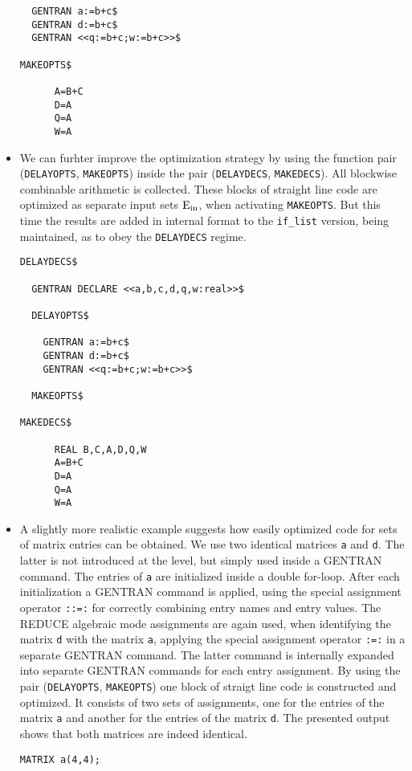 \begin{itemize}
{\begin{verbatim}
  GENTRAN a:=b+c$
  GENTRAN d:=b+c$
  GENTRAN <<q:=b+c;w:=b+c>>$

MAKEOPTS$

      A=B+C
      D=A
      Q=A
      W=A
\end{verbatim}}
\item We can furhter improve the optimization strategy by using the 
function pair ({\tt DELAYOPTS}, {\tt MAKEOPTS}) inside the 
pair ({\tt DELAYDECS}, {\tt MAKEDECS}). All blockwise combinable arithmetic
is collected. These blocks of straight line code are optimized as separate
input sets ${\rm E_{in}}$, when activating {\tt MAKEOPTS}. But this time the
results are added in internal format to the {\tt if\_list} version, 
being maintained, as to obey the {\tt DELAYDECS} regime.
{\small
\begin{verbatim}
DELAYDECS$

  GENTRAN DECLARE <<a,b,c,d,q,w:real>>$

  DELAYOPTS$

    GENTRAN a:=b+c$
    GENTRAN d:=b+c$
    GENTRAN <<q:=b+c;w:=b+c>>$

  MAKEOPTS$

MAKEDECS$

      REAL B,C,A,D,Q,W
      A=B+C
      D=A
      Q=A
      W=A
\end{verbatim}}
\item A slightly more realistic example suggests how easily optimized code
for sets of matrix entries can be obtained. We use two identical matrices
{\tt a} and {\tt d}. The latter is not introduced at the {\REDUCE} level,
but simply used inside a GENTRAN command. The entries of {\tt a} are
initialized inside a double for-loop. After each initialization a GENTRAN
command is applied, using the special assignment operator {\tt ::=:} for
correctly combining entry names and entry values. The REDUCE algebraic mode 
assignments are again used, when identifying the matrix {\tt d} with the 
matrix {\tt a}, applying the special assignment operator {\tt :=:} in a 
separate GENTRAN command. The latter command is internally expanded into
separate GENTRAN commands for each entry assignment. By using the pair
({\tt DELAYOPTS}, {\tt MAKEOPTS}) one block of straigt line code is
constructed and optimized. It consists of two sets of assignments, one 
for the entries of the matrix {\tt a} and another for the entries of the 
matrix {\tt d}. The presented output shows that both matrices are indeed 
identical.
{\small
\begin{verbatim}
MATRIX a(4,4);


\end{verbatim}}
\end{itemize}
